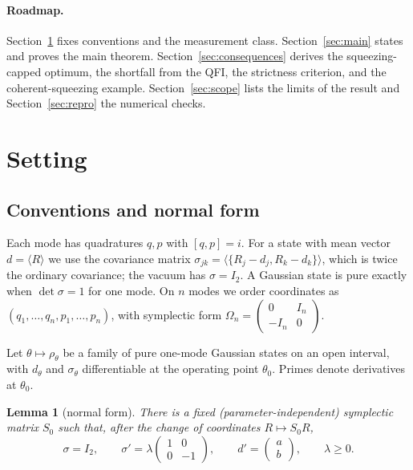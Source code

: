\documentclass[11pt,a4paper]{article}
\newtheorem{lemma}{Lemma}
\theoremstyle{definition}\newtheorem{definition}{Definition}
\theoremstyle{remark}\newtheorem{remark}{Remark}
\begin{document}
\paragraph{Roadmap.}
Section~\ref{sec:setting} fixes conventions and the measurement class. Section~\ref{sec:main} states and proves the main theorem. Section~\ref{sec:consequences} derives the squeezing-capped optimum, the shortfall from the QFI, the strictness criterion, and the coherent-squeezing example. Section~\ref{sec:scope} lists the limits of the result and Section~\ref{sec:repro} the numerical checks.

\section{Setting}\label{sec:setting}

\subsection{Conventions and normal form}

Each mode has quadratures $q,p$ with $[q,p]=i$. For a state with mean vector $d=\langle R\rangle$ we use the covariance matrix $\sigma_{jk}=\langle\{R_j-d_j,R_k-d_k\}\rangle$, which is twice the ordinary covariance; the vacuum has $\sigma=I_2$. A Gaussian state is pure exactly when $\det\sigma=1$ for one mode. On $n$ modes we order coordinates as $(q_1,\dots,q_n,p_1,\dots,p_n)$, with symplectic form $\Omega_n=\left(\begin{smallmatrix}0&I_n\\-I_n&0\end{smallmatrix}\right)$.

Let $\theta\mapsto\rho_\theta$ be a family of pure one-mode Gaussian states on an open interval, with $d_\theta$ and $\sigma_\theta$ differentiable at the operating point $\theta_0$. Primes denote derivatives at $\theta_0$.

\begin{lemma}[normal form]\label{lem:normal}
There is a fixed (parameter-independent) symplectic matrix $S_0$ such that, after the change of coordinates $R\mapsto S_0R$,
\begin{equation}\label{eq:normal}
\sigma=I_2,\qquad \sigma'=\lambda\begin{pmatrix}1&0\\0&-1\end{pmatrix},\qquad d'=\begin{pmatrix}a\\ b\end{pmatrix},\qquad \lambda\ge0 .
\end{equation}
\end{lemma}
\end{document}
